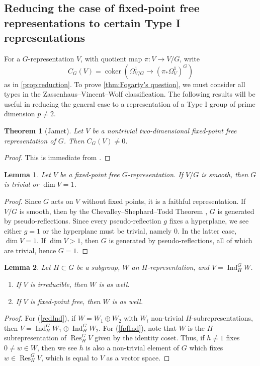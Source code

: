 \documentclass{amsart}
\newtheorem{theorem}{Theorem}[section]
\newtheorem{lemma}[lemma]{Lemma}
\theoremstyle{definition}
\DeclareMathOperator{\Res}{Res}
\DeclareMathOperator{\Ind}{Ind}
\begin{document}
\subsection{Reducing the case of fixed-point free representations to certain Type I representations}

For a $G$-representation $V$, with quotient map $\pi:V\to V/G$, write
\[
 C_G(V)=
 \operatorname{coker}\!\left(
 \Omega_{V/G}^1\longrightarrow(\pi_*\Omega_V^1)^G
 \right)
\]
as in \autoref{prop:reduction}. To prove \autoref{thm:Fogarty's question}, we must consider all types in the Zassenhaus--Vincent--Wolf classification. The following results will be useful in reducing the general case to a representation of a Type I group of prime dimension $p\neq 2$. 


\begin{theorem}[Jamet]\label{lem:surface}
Let $V$ be a nontrivial two-dimensional fixed-point free representation of
$G$.  Then $C_G(V)\neq0$.
\end{theorem}
\begin{proof}
This is immediate from \cite[Theorem 4.1]{Jamet}.
\end{proof}

\begin{lemma}\label{fixed-pt-free->singular-quotient}
Let $V$ be a fixed-point free $G$-representation. If $V/G$ is smooth, then $G$ is trivial or $\dim V=1$.
\end{lemma}
\begin{proof}
    Since $G$ acts on $V$ without fixed points, it is a faithful representation. If $V/G$ is smooth, then by the Chevalley--Shephard--Todd Theorem \cite{Chevalley,ShephardTodd}, $G$ is generated by pseudo-reflections. Since every pseudo-reflection $g$ fixes a hyperplane, we see either $g=1$ or the hyperplane must be trivial, namely $0$. In the latter case, $\dim V=1$. If $\dim V>1$, then $G$ is generated by pseudo-reflections, all of which are trivial, hence $G=1$.
\end{proof}

\begin{lemma}\label{l:induction-properties}
Let $H\subset G$ be a subgroup, $W$ an $H$-representation, and $V=\Ind_H^GW$. 
\begin{enumerate}
    \item\label{redInd} If $V$ is irreducible, then $W$ is as well.
    \item\label{fpfInd} If $V$ is fixed-point free, then $W$ is as well.
\end{enumerate}
\end{lemma}
\begin{proof}
    For (\ref{redInd}), if $W=W_1\oplus W_2$ with $W_i$ non-trivial $H$-subrepresentations, then $V=\Ind_H^GW_1\oplus\Ind_H^GW_2$. For (\ref{fpfInd}), note that $W$ is the $H$-subrepresentation of $\Res^G_HV$ given by the identity coset. Thus, if $h\neq1$ fixes $0\neq w\in W$, then we see $h$ is also a non-trivial element of $G$ which fixes $w\in\Res^G_HV$, which is equal to $V$ as a vector space.
\end{proof}
\end{document}

